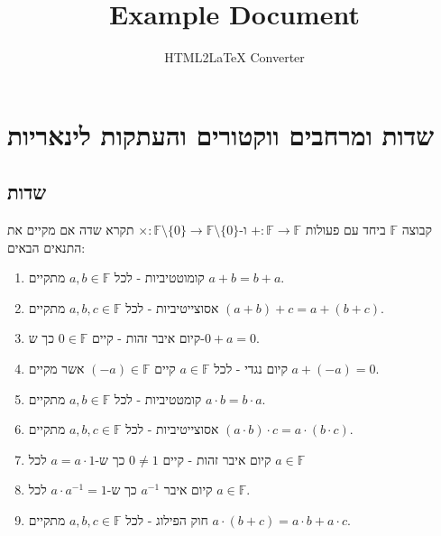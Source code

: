 \documentclass{tstextbook}
\begin{document}
\title{Example Document}
\author{HTML2LaTeX Converter}
\maketitle

\chapter{שדות ומרחבים ווקטורים והעתקות לינאריות}

\section{שדות}

\begin{definition}[שדה]
קבוצה \(\mathbb{F}\) ביחד עם פעולות \(+:\mathbb{F} \to \mathbb{F}\) ו-\(\times:\mathbb{F} \setminus \{ 0 \}\to \mathbb{F} \setminus \{ 0 \}\) תקרא שדה אם מקיים את התנאים הבאים:

  \begin{enumerate}
    \item קומוטטיביות - לכל \(a,b \in \mathbb{F}\) מתקיים \(a+b=b+a\). 


    \item אסוצייטיביות - לכל \(a,b,c \in \mathbb{F}\) מתקיים \((a+b)+c=a+(b+c)\). 


    \item קיום איבר זהות - קיים \(0 \in \mathbb{F}\) כך ש-\(0+a=0\). 


    \item קיום נגדי - לכל \(a \in \mathbb{F}\) קיים \((-a) \in \mathbb{F}\) אשר מקיים \(a+(-a)=0\). 


    \item קומטטיביות - לכל \(a,b \in \mathbb{F}\) מתקיים \(a\cdot b=b\cdot a\). 


    \item אסוצייטיביות - לכל \(a,b,c \in \mathbb{F}\) מתקיים \(\left( a\cdot b \right)\cdot c=a\cdot\left( b\cdot c \right)\). 


    \item קיום איבר זהות - קיים \(0\neq 1\) כך ש-\(a=a\cdot 1\) לכל \(a \in \mathbb{F}\)


    \item קיום איבר \(a^{-1}\) כך ש-\(a\cdot a ^{-1}= 1\) לכל \(a \in \mathbb{F}\). 


    \item חוק הפילוג - לכל \(a,b,c \in \mathbb{F}\) מתקיים \(a\cdot(b+c)=a\cdot b+a\cdot c\). 


  \end{enumerate}
\end{definition}
\end{document}

